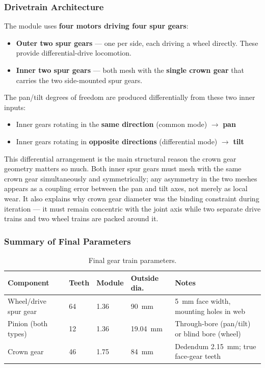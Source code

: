 \documentclass[12pt,a4paper]{article}
\begin{document}
\subsubsection{Drivetrain Architecture}

The module uses \textbf{four motors driving four spur gears}:
\begin{itemize}
	\item \textbf{Outer two spur gears} --- one per side, each driving a wheel
	      directly. These provide differential-drive locomotion.
	\item \textbf{Inner two spur gears} --- both mesh with the \textbf{single
	      crown gear} that carries the two side-mounted spur gears.
\end{itemize}

The pan/tilt degrees of freedom are produced differentially from these two
inner inputs:
\begin{itemize}
	\item Inner gears rotating in the \textbf{same direction} (common mode)
	      $\rightarrow$ \textbf{pan}
	\item Inner gears rotating in \textbf{opposite directions} (differential
	      mode) $\rightarrow$ \textbf{tilt}
\end{itemize}

This differential arrangement is the main structural reason the crown gear
geometry matters so much. Both inner spur gears must mesh with the same crown
gear simultaneously and symmetrically; any asymmetry in the two meshes appears
as a coupling error between the pan and tilt axes, not merely as local wear. It
also explains why crown gear diameter was the binding constraint during
iteration --- it must remain concentric with the joint axis while two separate
drive trains and two wheel trains are packed around it.

\subsubsection{Summary of Final Parameters}

\begin{table}[htbp]
	\centering
	\caption{Final gear train parameters.}
	\label{tab:final-params}
	\begin{tabular}{llllp{4.0cm}}
		\toprule
		\textbf{Component} & \textbf{Teeth} & \textbf{Module} & \textbf{Outside dia.} & \textbf{Notes} \\
		\midrule
		Wheel/drive spur gear & 64 & \num{1.36} & \SI{90}{\milli\metre} &
		\SI{5}{\milli\metre} face width, mounting holes in web \\
		\addlinespace
		Pinion (both types) & 12 & \num{1.36} & \SI{19.04}{\milli\metre} &
		Through-bore (pan/tilt) or blind bore (wheel) \\
		\addlinespace
		Crown gear & 46 & \num{1.75} & \SI{84}{\milli\metre} &
		Dedendum \SI{2.15}{\milli\metre}; true face-gear teeth \\
		\bottomrule
	\end{tabular}
\end{table}
\end{document}

